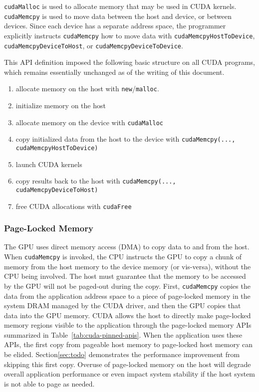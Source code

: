 \texttt{cudaMalloc} is used to allocate memory that may be used in CUDA kernels.
\texttt{cudaMemcpy} is used to move data between the host and device, or between devices.
Since each device has a separate address space, the programmer explicitly instructs \texttt{cudaMemcpy} how to move data with \texttt{cudaMemcpyHostToDevice}, \texttt{cudaMemcpyDeviceToHost}, or \texttt{cudaMemcpyDeviceToDevice}.

This API definition imposed the following basic structure on all CUDA programs, which remains essentially unchanged as of the writing of this document.
\begin{enumerate}
	\item allocate memory on the host with \texttt{new}/\texttt{malloc}.
	\item initialize memory on the host
	\item allocate memory on the device with \texttt{cudaMalloc}
	\item copy initialized data from the host to the device with \texttt{cudaMemcpy(..., cudaMemcpyHostToDevice)}
	\item launch CUDA kernels
	\item copy results back to the host with \texttt{cudaMemcpy(..., cudaMemcpyDeviceToHost)}
	\item free CUDA allocations with \texttt{cudaFree}
\end{enumerate}


\subsubsection{Page-Locked Memory}

The GPU uses direct memory access (DMA) to copy data to and from the host.
When \texttt{cudaMemcpy} is invoked, the CPU instructs the GPU to copy a chunk of memory from the host memory to the device memory (or vis-versa), without the CPU being involved.
The host must guarantee that the memory to be accessed by the GPU will not be paged-out during the copy.
First, \texttt{cudaMemcpy} copies the data from the application address space to a piece of page-locked memory in the system DRAM managed by the CUDA driver, and then the GPU copies that data into the GPU memory.
CUDA allows the host to directly make page-locked memory regions visible to the application through the page-locked memory APIs summarized in Table~\ref{tab:cuda-pinned-apis}.
When the application uses these APIs, the first copy from pageable host memory to page-locked host memory can be elided.
Section{\ref{sec:todo}} demonstrates the performance improvement from skipping this first copy.
Overuse of page-locked memory on the host will degrade overall application performance or even impact system stability if the host system is not able to page as needed.

